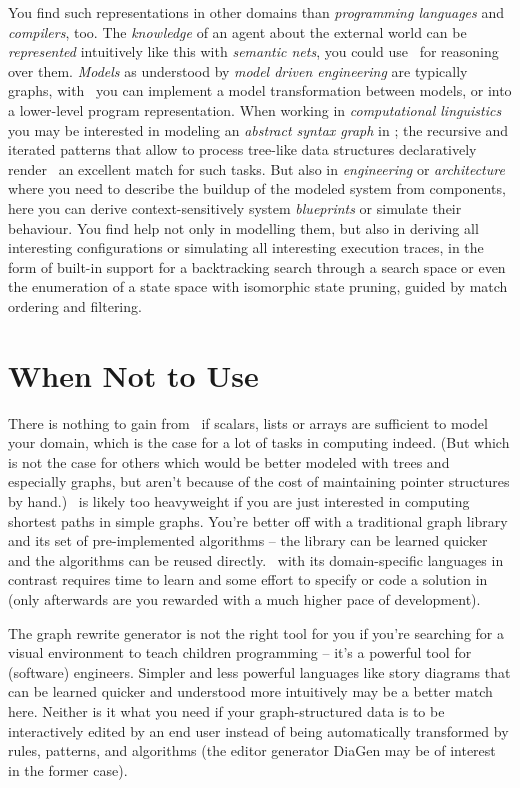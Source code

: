 You find such representations in other domains than \emph{programming languages} and \emph{compilers}, too.
The \emph{knowledge} of an agent about the external world can be \emph{represented} intuitively like this with \emph{semantic nets}, you could use \GrG\ for reasoning over them.
\emph{Models} as understood by \emph{model driven engineering} are typically graphs, with \GrG\ you can implement a model transformation between models, or into a lower-level program representation.
When working in \emph{computational linguistics} you may be interested in modeling an \emph{abstract syntax graph} in \GrG;
the recursive and iterated patterns that allow to process tree-like data structures declaratively render \GrG\ an excellent match for such tasks.
But also in \emph{engineering} or \emph{architecture} where you need to describe the buildup of the modeled system from components, here you can derive context-sensitively system \emph{blueprints} or simulate their behaviour.
You find help not only in modelling them, but also in deriving all interesting configurations or simulating all interesting execution traces, in the form of built-in support for a backtracking search through a search space or even the enumeration of a state space with isomorphic state pruning, guided by match ordering and filtering.


\section{When Not to Use \GrG}
There is nothing to gain from \GrG\ if scalars, lists or arrays are sufficient to model your domain,
which is the case for a lot of tasks in computing indeed.
(But which is not the case for others which would be better modeled with trees and especially graphs,
but aren't because of the cost of maintaining pointer structures by hand.)
\GrG\ is likely too heavyweight if you are just interested in computing shortest paths in simple graphs.
You're better off with a traditional graph library and its set of pre-implemented algorithms --
the library can be learned quicker and the algorithms can be reused directly.
\GrG\ with its domain-specific languages in contrast requires time to learn and some effort to specify or code a solution in (only afterwards are you rewarded with a much higher pace of development).

The graph rewrite generator is not the right tool for you if you're searching for a visual environment to teach children programming -- it's a powerful tool for (software) engineers.
Simpler and less powerful languages like story diagrams\cite{storydiagrams} that can be learned quicker and understood more intuitively may be a better match here.
Neither is it what you need if your graph-structured data is to be interactively edited by an end user instead of being automatically transformed by rules, patterns, and algorithms (the editor generator DiaGen\cite{diagen} may be of interest in the former case).

